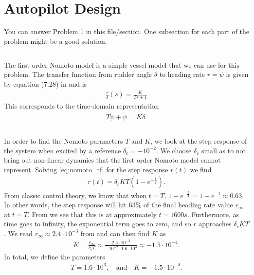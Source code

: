 \section{Autopilot Design}
You can answer Problem 1 in this file/section. One subsection for each part of the problem might be a good solution.

\subsection{}
The first order Nomoto model is a simple vessel model that we can use for this problem. The transfer function from rudder angle $\delta$ to heading rate $r = \dot \psi$ is given by equation (7.28) in \cite{Fossen2011} and is
\begin{equation}\begin{aligned}
\label{eq:nomoto_tf}
\frac{r}{\delta}(s) = \frac{K}{Ts + 1}
\end{aligned}\end{equation}
This corresponds to the time-domain representation
\begin{equation}\begin{aligned}
T \ddot \psi + \dot \psi = K \delta.
\end{aligned}\end{equation}

\subsection{}
In order to find the Nomoto parameters $T$ and $K$, we look at the step response of the system when excited by a reference $\delta_c = -10^{-2}$. We choose $\delta_c$ small as to not bring out non-linear dynamics that the first order Nomoto model cannot represent. Solving \eqref{eq:nomoto_tf} for the step response $r(t)$ we find
\begin{equation}\begin{aligned}
r(t) = \delta_c KT(1 - e^{-\frac{t}{T}}).
\end{aligned}\end{equation}
From classic control theory, we know that when $t = T$, $1 - e^{-\frac{t}{T}} = 1 - e^{-1} \approx 0.63$. In other words, the step response will hit $63\%$ of the final heading rate value $r_{\infty}$ at $t = T$. From  we see that this is at approximately $t = 1600s$. Furthermore, as time goes to infinity, the exponential term goes to zero, and so $r$ approaches $\delta_c K T$. We read $r_\infty \approx 2.4 \cdot 10^{-3}$ from  and can then find $K$ as
\begin{equation}\begin{aligned}
K = \frac{r_{\infty}}{\delta_c T} \approx \frac{2.4 \cdot 10^{-3}}{-10^{-2} \cdot 1.6 \cdot 10^{3}} \approx -1.5 \cdot 10^{-4}.
\end{aligned}\end{equation}
In total, we define the parameters
\begin{equation}\begin{aligned}
T = 1.6 \cdot 10^3, \quad \text{and} \quad K = -1.5 \cdot 10^{-4}.
\end{aligned}\end{equation}

